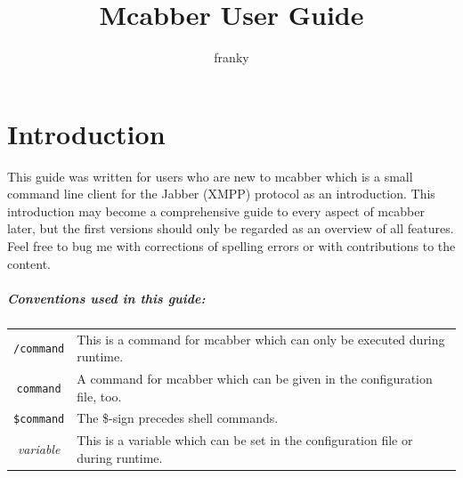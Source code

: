 \documentclass[12pt,oneside,a4]{book}
\title{Mcabber User Guide}
\author{franky}
\begin{document}
\maketitle
\tableofcontents
\chapter*{Introduction}
This guide was written for users who are new to mcabber\cite{mcabber} which is a small
command line client for the Jabber (XMPP) protocol\cite{jabber} as an introduction. This introduction may
become a comprehensive guide to every aspect of mcabber later, but the first versions should only be
regarded as an overview of all features. Feel free to bug me with corrections of spelling errors or
with contributions to the content.
\paragraph{Conventions used in this guide:\\}
\begin{tabular}{ c p{10cm} }
	\verb+/command+ & This is a command for mcabber which can only be executed during runtime.\\
	\verb+command+ & A command for mcabber which can be given in the configuration file, too.\\
	\verb+$command+ & The \$-sign precedes shell commands.\\
	\textit{variable} & This is a variable which can be set in the configuration file or during runtime. \\
\end{tabular}
\end{document}
